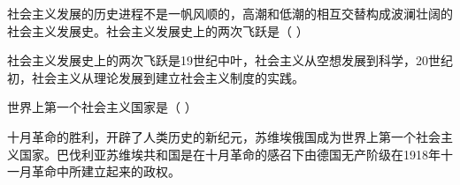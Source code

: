 \question 社会主义发展的历史进程不是一帆风顺的，高潮和低潮的相互交替构成波澜壮阔的社会主义发展史。社会主义发展史上的两次飞跃是（
）
\par{}
\begin{solution}社会主义发展史上的两次飞跃是19世纪中叶，社会主义从空想发展到科学，20世纪初，社会主义从理论发展到建立社会主义制度的实践。
\end{solution}
\question 世界上第一个社会主义国家是（ ）
\par{}
\begin{solution}十月革命的胜利，开辟了人类历史的新纪元，苏维埃俄国成为世界上第一个社会主义国家。巴伐利亚苏维埃共和国是在十月革命的感召下由德国无产阶级在1918年十一月革命中所建立起来的政权。
\end{solution}
